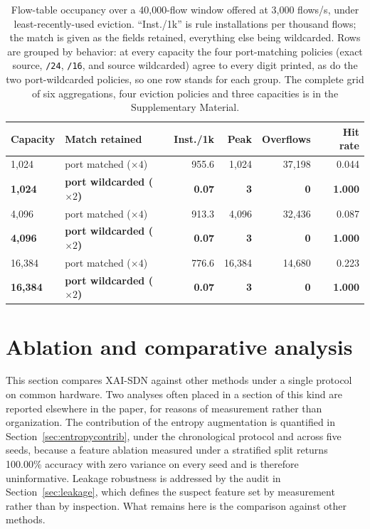 \documentclass{ieeeaccess}
\begin{document}
\begin{table}[!t]
\caption{Flow-table occupancy over a 40,000-flow window offered at 3,000
flows/s, under least-recently-used eviction. ``Inst./1k'' is rule installations
per thousand flows; the match is given as the fields retained, everything else
being wildcarded. Rows are grouped by behavior: at every capacity the four
port-matching policies (exact source, \texttt{/24}, \texttt{/16}, and source
wildcarded) agree to every digit printed, as do the two port-wildcarded
policies, so one row stands for each group. The complete grid of six
aggregations, four eviction policies and three capacities is in the
Supplementary Material.}
\centering
\label{tab:tcam}
\footnotesize
\setlength{\tabcolsep}{3.5pt}
\renewcommand{\arraystretch}{1.15}
\begin{tabular}{@{}llrrrr@{}}
\toprule
\textbf{Capacity} & \textbf{Match retained} & \textbf{Inst./1k} &
\textbf{Peak} & \textbf{Overflows} & \textbf{Hit rate} \\
\midrule
1,024  & port matched ($\times 4$)   & 955.6 & 1,024 & 37,198 & 0.044 \\
\textbf{1,024}  & \textbf{port wildcarded ($\times 2$)} & \textbf{0.07} & \textbf{3} & \textbf{0} & \textbf{1.000} \\
\midrule
4,096  & port matched ($\times 4$)   & 913.3 & 4,096 & 32,436 & 0.087 \\
\textbf{4,096}  & \textbf{port wildcarded ($\times 2$)} & \textbf{0.07} & \textbf{3} & \textbf{0} & \textbf{1.000} \\
\midrule
16,384 & port matched ($\times 4$)   & 776.6 & 16,384 & 14,680 & 0.223 \\
\textbf{16,384} & \textbf{port wildcarded ($\times 2$)} & \textbf{0.07} & \textbf{3} & \textbf{0} & \textbf{1.000} \\
\bottomrule
\end{tabular}
\end{table}

\section{Ablation and comparative analysis}
\label{sec:comparative}

This section compares XAI-SDN against other methods under a single protocol on
common hardware. Two analyses often placed in a section of this kind are
reported elsewhere in the paper, for reasons of measurement rather than
organization. The contribution of the entropy augmentation is quantified in
Section~\ref{sec:entropycontrib}, under the chronological protocol and across
five seeds, because a feature ablation measured under a stratified split
returns 100.00\% accuracy with zero variance on every seed and is therefore
uninformative. Leakage robustness is addressed by the audit in
Section~\ref{sec:leakage}, which defines the suspect feature set by
measurement rather than by inspection. What remains here is the comparison
against other methods.
\end{document}
